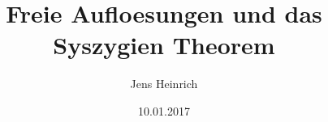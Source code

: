 \usepackage[left=3cm,right=3cm]{geometry}
\usepackage[T1]{fontenc}
\usepackage{lmodern}
\usepackage{standalone}






\usepackage[ngerman]{babel}
\renewcommand{\id}{\ensuremath{Id}}
\renewcommand{\familydefault}{\rmdefault}

\title{Freie Aufloesungen und das Syszygien Theorem}
\author{Jens Heinrich}
\date{10.01.2017}


